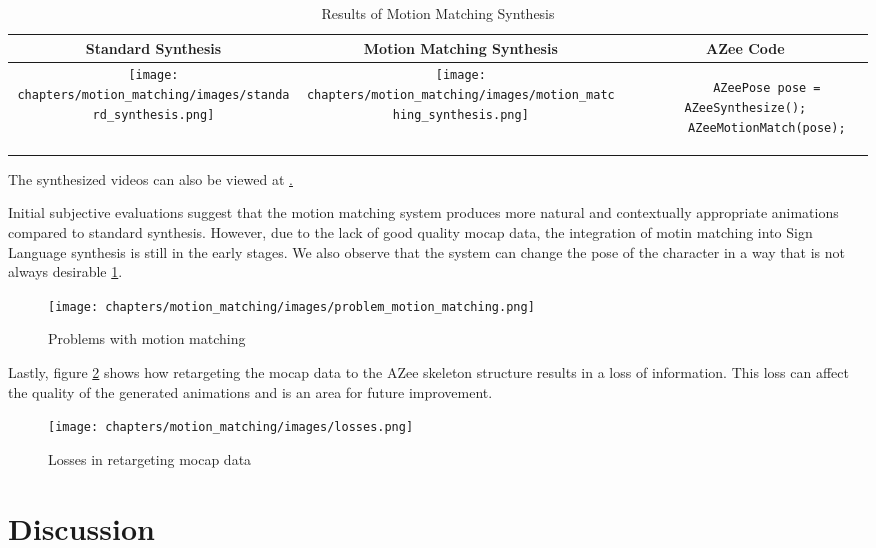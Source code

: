 \documentclass[../../main.tex]{subfiles}
\begin{document}
\begin{table}
  \centering
  \begin{tabular}{|c|c|c|}
    \hline
    \textbf{Standard Synthesis} & \textbf{Motion Matching Synthesis} & \textbf{AZee Code} \\
    \hline
    \texttt{[image: chapters/motion\_matching/images/standard\_synthesis.png]} & \texttt{[image: chapters/motion\_matching/images/motion\_matching\_synthesis.png]} & \begin{lstlisting}
      AZeePose pose = AZeeSynthesize();
      AZeeMotionMatch(pose);
    \end{lstlisting} \\
    \hline
  \end{tabular}
  \caption{Results of Motion Matching Synthesis}
  \label{tab:results}
\end{table}

The synthesized videos can also be viewed at \href{todo}.

Initial subjective evaluations suggest that the motion matching system produces more natural and contextually appropriate animations compared to standard synthesis. However, due to the lack of good quality mocap data, the integration of motin matching into Sign Language synthesis is still in the early stages. We also observe that the system can change the pose of the character in a way that is not always desirable \ref{fig:problem_motion_matching}.

\begin{figure}
  \centering \texttt{[image: chapters/motion\_matching/images/problem\_motion\_matching.png]}
  \caption{Problems with motion matching}
  \label{fig:problem_motion_matching}
\end{figure}

Lastly, figure \ref{fig:losses} shows how retargeting the mocap data to the AZee skeleton structure results in a loss of information. This loss can affect the quality of the generated animations and is an area for future improvement.

\begin{figure}
  \centering \texttt{[image: chapters/motion\_matching/images/losses.png]}
  \caption{Losses in retargeting mocap data}
  \label{fig:losses}
\end{figure}

\section{Discussion}
\label{ch:motion_matching:discussion}
\end{document}
